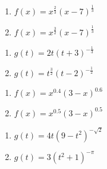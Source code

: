 \documentclass{ximera}
\begin{document}
\begin{multicols}{2}
\begin{enumerate}
\setcounter{enumi}{\value{HW}}

\item $f(x) = x^{\frac{2}{3}}(x - 7)^{\frac{1}{3}}$  \label{powerfcngraphexfirst}
\item $f(x) = x^{\frac{3}{2}}(x - 7)^{\frac{1}{3}}$ 


\setcounter{HW}{\value{enumi}}
\end{enumerate}
\end{multicols}

\begin{multicols}{2}
\begin{enumerate}
\setcounter{enumi}{\value{HW}}

\item $g(t) = 2t(t+3)^{-\frac{1}{3}}$ 
\item $g(t) = t^{\frac{3}{2}}(t-2)^{-\frac{1}{2}}$ 


\setcounter{HW}{\value{enumi}}
\end{enumerate}
\end{multicols}

\begin{multicols}{2}
\begin{enumerate}
\setcounter{enumi}{\value{HW}}

\item $f(x) = x^{0.4} (3-x)^{0.6}$ 
\item $f(x) = x^{0.5} (3-x)^{0.5}$ 


\setcounter{HW}{\value{enumi}}
\end{enumerate}
\end{multicols}

\begin{multicols}{2}
\begin{enumerate}
\setcounter{enumi}{\value{HW}}

\item $g(t) = 4t (9-t^2)^{-\sqrt{2}}$ 
\item $g(t) = 3(t^2+1)^{-\pi}$  \label{powerfcngraphexlast}


\setcounter{HW}{\value{enumi}}
\end{enumerate}
\end{multicols}
\end{document}
